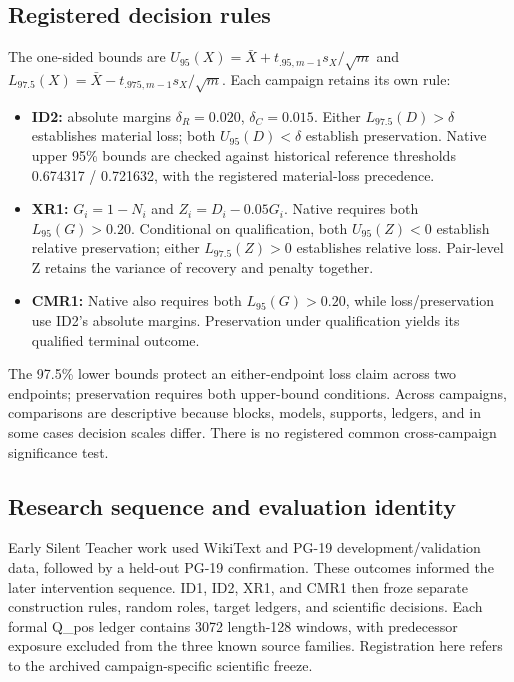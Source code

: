 \subsection{Registered decision rules}\label{registered-decision-rules}

The one-sided bounds are \(U_{95}(X)=\bar X+t_{.95,m-1}s_X/\sqrt m\) and \(L_{97.5}(X)=\bar X-t_{.975,m-1}s_X/\sqrt m\). Each campaign retains its own rule:

\begin{itemize}
\tightlist
\item
  \textbf{ID2:} absolute margins \(\delta_R=0.020\), \(\delta_C=0.015\). Either \(L_{97.5}(D)>\delta\) establishes material loss; both \(U_{95}(D)<\delta\) establish preservation. Native upper 95\% bounds are checked against historical reference thresholds 0.674317 / 0.721632, with the registered material-loss precedence.
\item
  \textbf{XR1:} \(G_i=1-N_i\) and \(Z_i=D_i-0.05G_i\). Native requires both \(L_{95}(G)>0.20\). Conditional on qualification, both \(U_{95}(Z)<0\) establish relative preservation; either \(L_{97.5}(Z)>0\) establishes relative loss. Pair-level Z retains the variance of recovery and penalty together.
\item
  \textbf{CMR1:} Native also requires both \(L_{95}(G)>0.20\), while loss/preservation use ID2's absolute margins. Preservation under qualification yields its qualified terminal outcome.
\end{itemize}

The 97.5\% lower bounds protect an either-endpoint loss claim across two endpoints; preservation requires both upper-bound conditions. Across campaigns, comparisons are descriptive because blocks, models, supports, ledgers, and in some cases decision scales differ. There is no registered common cross-campaign significance test.

\subsection{Research sequence and evaluation identity}\label{research-sequence-and-evaluation-identity}

Early Silent Teacher work used WikiText and PG-19 development/validation data, followed by a held-out PG-19 confirmation. These outcomes informed the later intervention sequence. ID1, ID2, XR1, and CMR1 then froze separate construction rules, random roles, target ledgers, and scientific decisions. Each formal Q\_pos ledger contains 3072 length-128 windows, with predecessor exposure excluded from the three known source families. Registration here refers to the archived campaign-specific scientific freeze.

